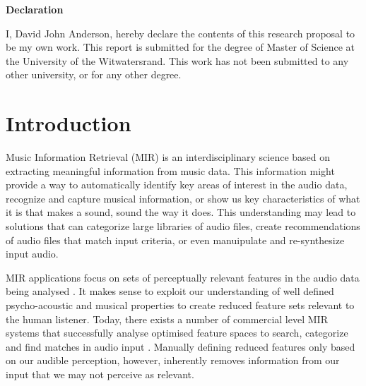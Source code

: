 \documentclass[12pt]{article}
\begin{document}
\newpage

\textbf{\Huge{Declaration}}

\bigskip

I, David John Anderson, hereby declare the contents of this research proposal to be my own work. This report is submitted for the degree of Master of Science at the University of the Witwatersrand. This work has not been submitted to any other university, or for any other degree.

\newpage

\tableofcontents

\newpage
{}

\section{Introduction}

Music Information Retrieval (MIR) is an interdisciplinary science based on extracting meaningful information from music data. This information might provide a way to automatically identify key areas of interest in the audio data, recognize and capture musical information, or show us key characteristics of what it is that makes a sound, sound the way it does. This understanding may lead to solutions that can categorize large libraries of audio files, create recommendations of audio files that match input criteria, or even manuipulate and re-synthesize input audio.

MIR applications focus on sets of perceptually relevant features in the audio data being analysed \citep{Lidy05,mirSurvey05}. It makes sense to exploit our understanding of well defined psycho-acoustic and musical properties to create reduced feature sets relevant to the human listener. Today, there exists a number of commercial level MIR systems that successfully analyse optimised feature spaces to search, categorize and find matches in audio input \citep{mirSurvey05}. Manually defining reduced features only based on our audible perception, however, inherently removes information from our input that we may not perceive as relevant. 
\end{document}
